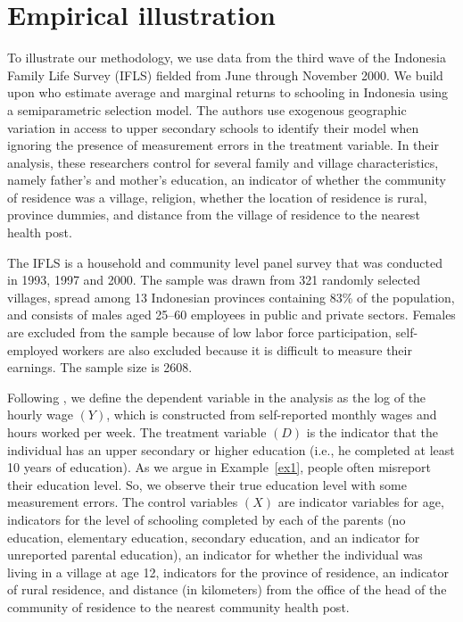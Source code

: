 \documentclass[11pt,reqno]{amsart}
\theoremstyle{plain}
\numberwithin{equation}{section}
\begin{document}
\section{Empirical illustration}\label{App}
To illustrate our methodology, we use data from the third wave of the Indonesia Family Life Survey (IFLS) fielded from June through November 2000. We build upon \cite{Carneiroal2017} who estimate average and marginal returns to schooling in Indonesia using a semiparametric selection model. The authors use exogenous geographic variation in access to upper secondary schools to identify their model when ignoring the presence of measurement errors in the treatment variable. In their analysis, these researchers control for several family and village characteristics, namely father’s and mother’s education, an indicator of whether the community of residence was a village, religion, whether the location of residence is rural, province dummies, and distance from the village of residence to the nearest health post.

 The IFLS is a household and community level panel survey that was conducted in 1993, 1997 and 2000. The sample was drawn from 321 randomly selected villages, spread among 13 Indonesian provinces containing 83\%  of the population, and consists of males aged 25--60 employees in public and private sectors. Females are excluded from the sample because of low labor force participation, self-employed workers are also excluded because it is difficult to measure their earnings. The sample size is 2608.

Following \cite{Carneiroal2017}, we define the dependent variable in the  analysis as the log of the hourly wage $(Y)$, which is constructed from self-reported monthly wages and hours worked per week. The treatment variable $(D)$ is the indicator that the individual has an upper secondary or higher education (i.e., he completed at least 10 years of education). As we argue in Example~\ref{ex1}, people often misreport their education level. So, we observe their true education level with some measurement errors.
The control variables $(X)$ are indicator variables for age, indicators for the level of schooling completed by each of the parents (no education, elementary education, secondary education, and an indicator for unreported parental education), an indicator for whether the individual was living in a village at age 12, indicators for the province of residence, an indicator of rural residence, and distance (in kilometers) from the office of the head of the community of residence to the nearest community health post. 
\end{document}
